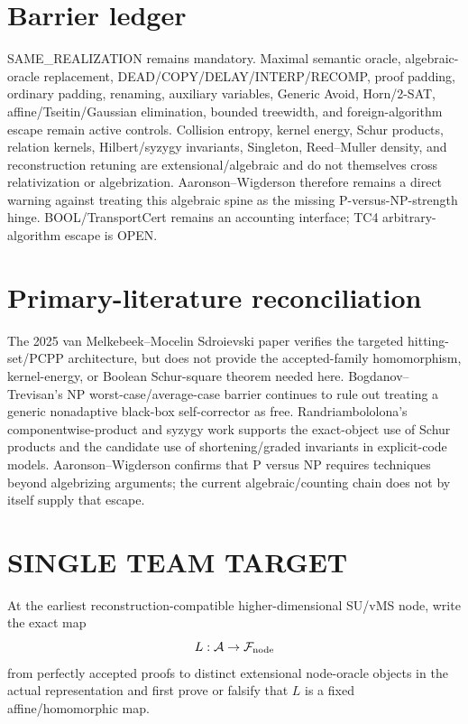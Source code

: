 \documentclass[11pt]{article}
\begin{document}
\section*{Barrier ledger}
SAME\_REALIZATION remains mandatory. Maximal semantic oracle, algebraic-oracle replacement, DEAD/COPY/DELAY/INTERP/RECOMP, proof padding, ordinary padding, renaming, auxiliary variables, Generic Avoid, Horn/2-SAT, affine/Tseitin/Gaussian elimination, bounded treewidth, and foreign-algorithm escape remain active controls. Collision entropy, kernel energy, Schur products, relation kernels, Hilbert/syzygy invariants, Singleton, Reed--Muller density, and reconstruction retuning are extensional/algebraic and do not themselves cross relativization or algebrization. Aaronson--Wigderson therefore remains a direct warning against treating this algebraic spine as the missing P-versus-NP-strength hinge. BOOL/TransportCert remains an accounting interface; TC4 arbitrary-algorithm escape is OPEN.

\section*{Primary-literature reconciliation}
The 2025 van Melkebeek--Mocelin Sdroievski paper verifies the targeted hitting-set/PCPP architecture, but does not provide the accepted-family homomorphism, kernel-energy, or Boolean Schur-square theorem needed here. Bogdanov--Trevisan's NP worst-case/average-case barrier continues to rule out treating a generic nonadaptive black-box self-corrector as free. Randriambololona's componentwise-product and syzygy work supports the exact-object use of Schur products and the candidate use of shortening/graded invariants in explicit-code models. Aaronson--Wigderson confirms that P versus NP requires techniques beyond algebrizing arguments; the current algebraic/counting chain does not by itself supply that escape.

\section*{SINGLE TEAM TARGET}
At the earliest reconstruction-compatible higher-dimensional SU/vMS node, write the exact map
\[
L:\mathcal A\to\mathcal F_{\rm node}
\]
from perfectly accepted proofs to distinct extensional node-oracle objects in the actual representation and first prove or falsify that \(L\) is a fixed affine/homomorphic map.
\end{document}
